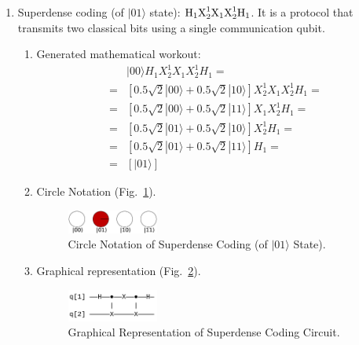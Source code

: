 \documentclass[sigconf,natbib=false]{acmart}
\begin{document}
\begin{enumerate}
		\item Superdense coding (of $|01\rangle$ state): $\text{H}_1 \text{X}^{1}_{2}\text{X}_1\text{X}^{1}_{2}\text{H}_1$. It is a protocol that transmits two classical bits using a single communication qubit.
        \begin{enumerate}
            \item Generated mathematical workout:
            \begin{align*}                
            &|00\rangle H_{1}X_{2}^{1}X_{1}X_{2}^{1}H_{1}=\\ 
                =& [0.5 \sqrt{2} |00\rangle +0.5 \sqrt{2} |10\rangle ]X_{2}^{1}X_{1}X_{2}^{1}H_{1}=\\ 
                =& [0.5 \sqrt{2} |00\rangle +0.5 \sqrt{2} |11\rangle ]X_{1}X_{2}^{1}H_{1}=\\ 
                =& [0.5 \sqrt{2} |01\rangle +0.5 \sqrt{2} |10\rangle ]X_{2}^{1}H_{1}=\\ 
                =& [0.5 \sqrt{2} |01\rangle +0.5 \sqrt{2} |11\rangle ]H_{1}=\\
                =& [ |01\rangle ]
            \end{align*}
            \item Circle Notation (Fig.~\ref{superdense_coding}). 
            \begin{figure}[!htb]
                \centerline{\includegraphics[width=0.3\textwidth]{superdense_coding}}
                \caption{Circle Notation of Superdense Coding (of $|01\rangle$ State).}
                \label{superdense_coding}
            \end{figure}
            \item Graphical representation (Fig.~\ref{superdense_coding_qc}).
            \begin{figure}[!htb]
                \centerline{\includegraphics[width=0.3\textwidth]{superdense_coding_qc}}
                \caption{Graphical Representation of Superdense Coding Circuit.}
                \label{superdense_coding_qc}
            \end{figure}
        \end{enumerate}
        

\end{enumerate}
\end{document}
